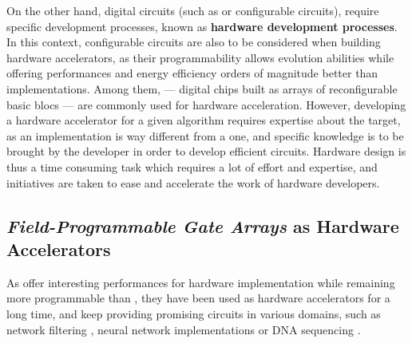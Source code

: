         On the other hand, digital circuits (such as  or configurable circuits), require specific development processes, known as {\bf hardware development processes}.
        In this context, configurable circuits are also to be considered when building hardware accelerators, as their programmability allows evolution abilities while offering performances and energy efficiency orders of magnitude better than  implementations.
        Among them,  --- digital chips built as arrays of reconfigurable basic blocs --- are commonly used for hardware acceleration.
        However, developing a hardware accelerator for a given algorithm requires expertise about the target, as an  implementation is way different from a  one, and specific knowledge is to be brought by the developer in order to develop efficient circuits.
        Hardware design is thus a time consuming task which requires a lot of effort and expertise, and initiatives are taken to ease and accelerate the work of hardware developers.
    \subsection[FPGAs as Hardware Accelerators]{{\it Field-Programmable Gate Arrays} as Hardware\\Accelerators}
        \label{ch.problem:sec.hardware:ssec.fpga}

            As  offer interesting performances for hardware implementation while remaining more programmable than , they have been used as hardware accelerators for a long time, and keep providing promising circuits in various domains, such as network filtering \cite{bruant_towards_2021},  neural network implementations \cite{nurvitadhi_can_2017} or DNA sequencing \cite{di_tucci_architectural_2017}.

